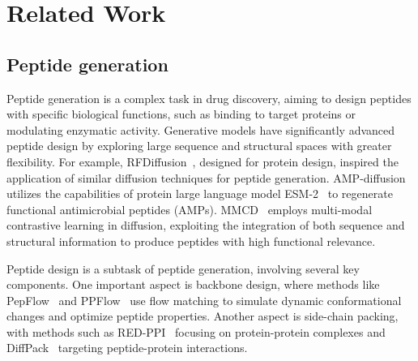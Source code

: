 \section{Related Work}
\subsection{Peptide generation}
Peptide generation is a complex task in drug discovery, aiming to design peptides with specific biological functions, such as binding to target proteins or modulating enzymatic activity. 
Generative models have significantly advanced peptide design by exploring large sequence and structural spaces with greater flexibility. For example, RFDiffusion~\cite{watson2023novo}, designed for protein design, inspired the application of similar diffusion techniques for peptide generation. 
AMP-diffusion~\cite{chen2024amp} utilizes the capabilities of protein large language model ESM-2~\cite{beal2015esm} to regenerate functional antimicrobial peptides (AMPs). 
MMCD~\cite{wang2024multi} employs multi-modal contrastive learning in diffusion, exploiting the integration of both sequence and structural information to produce peptides with high functional relevance.

Peptide design is a subtask of peptide generation, involving several key components. 
One important aspect is backbone design, where methods like PepFlow~\cite{li2024full} and PPFlow~\cite{lin2024ppflow} use flow matching to simulate dynamic conformational changes and optimize peptide properties. 
Another aspect is side-chain packing, with methods such as RED-PPI~\cite{luo2023rotamer} focusing on protein-protein complexes and DiffPack~\cite{zhang2024diffpack} targeting peptide-protein interactions.

